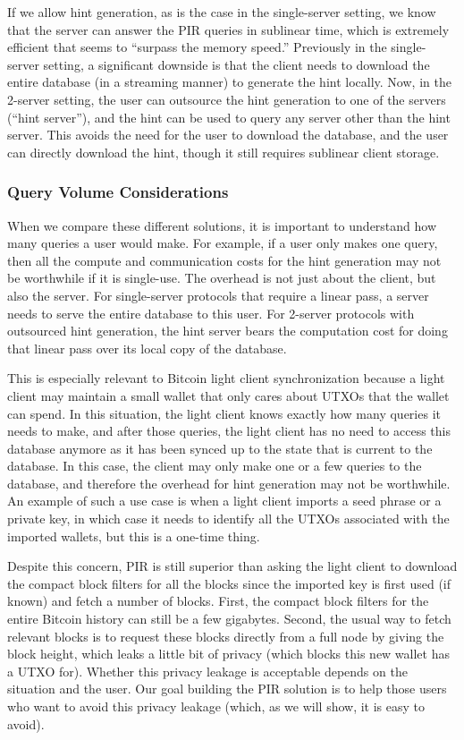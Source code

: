 If we allow hint generation, as is the case in the single-server setting, we know that the server can answer the PIR queries in sublinear time, which is extremely efficient that seems to ``surpass the memory speed.'' Previously in the single-server setting, a significant downside is that the client needs to download the entire database (in a streaming manner) to generate the hint locally. Now, in the 2-server setting, the user can outsource the hint generation to one of the servers (``hint server''), and the hint can be used to query any server other than the hint server. This avoids the need for the user to download the database, and the user can directly download the hint, though it still requires sublinear client storage.

\subsubsection{Query Volume Considerations}

When we compare these different solutions, it is important to understand how many queries a user would make. For example, if a user only makes one query, then all the compute and communication costs for the hint generation may not be worthwhile if it is single-use. The overhead is not just about the client, but also the server. For single-server protocols that require a linear pass, a server needs to serve the entire database to this user. For 2-server protocols with outsourced hint generation, the hint server bears the computation cost for doing that linear pass over its local copy of the database.

This is especially relevant to Bitcoin light client synchronization because a light client may maintain a small wallet that only cares about UTXOs that the wallet can spend. In this situation, the light client knows exactly how many queries it needs to make, and after those queries, the light client has no need to access this database anymore as it has been synced up to the state that is current to the database. In this case, the client may only make one or a few queries to the database, and therefore the overhead for hint generation may not be worthwhile. An example of such a use case is when a light client imports a seed phrase or a private key, in which case it needs to identify all the UTXOs associated with the imported wallets, but this is a one-time thing.

Despite this concern, PIR is still superior than asking the light client to download the compact block filters for all the blocks since the imported key is first used (if known) and fetch a  number of blocks. First, the compact block filters for the entire Bitcoin history can still be a few gigabytes. Second, the usual way to fetch relevant blocks is to request these blocks directly from a full node by giving the block height, which leaks a little bit of privacy (which blocks this new wallet has a UTXO for). Whether this privacy leakage is acceptable depends on the situation and the user. Our goal building the PIR solution is to help those users who want to avoid this privacy leakage (which, as we will show, it is easy to avoid).

